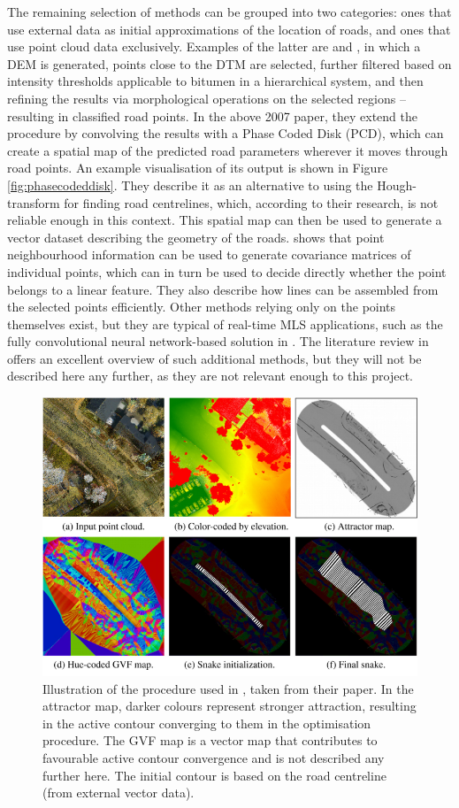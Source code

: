 The remaining selection of methods can be grouped into two categories: ones that use external data as initial approximations of the location of roads, and ones that use point cloud data exclusively.  Examples of the latter are \cite{clode_etal_2004} and \cite{clode_etal_2007}, in which a DEM is generated, points close to the DTM are selected, further filtered based on intensity thresholds applicable to bitumen in a hierarchical system, and then refining the results via morphological operations on the selected regions – resulting in classified road points. In the above 2007 paper, they extend the procedure by convolving the results with a Phase Coded Disk (PCD), which can create a spatial map of the predicted road parameters wherever it moves through road points. An example visualisation of its output is shown in Figure \ref{fig:phasecodeddisk}. They describe it as an alternative to using the Hough-transform for finding road centrelines, which, according to their research, is not reliable enough in this context. This spatial map can then be used to generate a vector dataset describing the geometry of the roads. \cite{gross_thoennessen_2006} shows that point neighbourhood information can be used to generate covariance matrices of individual points, which can in turn be used to decide directly whether the point belongs to a linear feature. They also describe how lines can be assembled from the selected points efficiently. Other methods relying only on the points themselves exist, but they are typical of real-time MLS applications, such as the fully convolutional neural network-based solution in \cite{caltagirone_etal_2017}. The literature review in \cite{yang_etal_2013} offers an excellent overview of such additional methods, but they will not be described here any further, as they are not relevant enough to this project.

\begin{figure}
    \centering
    \includegraphics[width=0.75\linewidth]{p2/figs/boyko_funkahuser_2011_01.png} 
    \caption{Illustration of the procedure used in \cite{boyko_funkhauser_2011}, taken from their paper. In the attractor map, darker colours represent stronger attraction, resulting in the active contour converging to them in the optimisation procedure. The GVF map is a vector map that contributes to favourable active contour convergence and is not described any further here. The initial contour is based on the road centreline (from external vector data).}
    \label{fig:activecontouroptimisation}
\end{figure}


